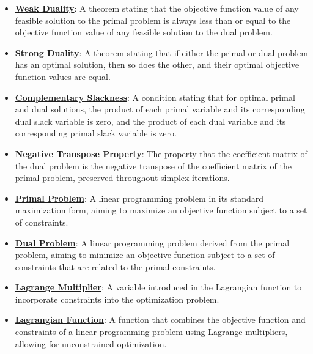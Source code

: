\documentclass{article}%
\begin{document}
\begin{itemize}[leftmargin=*]
\item \href{https://www.math.purdue.edu/~yipn/421/2024-09-12-Duality.pdf#page=2}{\textbf{Weak Duality}}: A theorem stating that the objective function value of any feasible solution to the primal problem is always less than or equal to the objective function value of any feasible solution to the dual problem.%
\item \href{https://www.math.purdue.edu/~yipn/421/2024-09-12-Duality.pdf#page=10}{\textbf{Strong Duality}}: A theorem stating that if either the primal or dual problem has an optimal solution, then so does the other, and their optimal objective function values are equal.%
\item \href{https://www.math.purdue.edu/~yipn/421/2024-09-12-Duality.pdf#page=5}{\textbf{Complementary Slackness}}: A condition stating that for optimal primal and dual solutions, the product of each primal variable and its corresponding dual slack variable is zero, and the product of each dual variable and its corresponding primal slack variable is zero.%
\item \href{https://www.math.purdue.edu/~yipn/421/2024-09-12-Duality.pdf#page=6}{\textbf{Negative Transpose Property}}: The property that the coefficient matrix of the dual problem is the negative transpose of the coefficient matrix of the primal problem, preserved throughout simplex iterations.%
\item \href{https://www.math.purdue.edu/~yipn/421/2024-09-17-DualityGeneral.pdf#page=1}{\textbf{Primal Problem}}: A linear programming problem in its standard maximization form, aiming to maximize an objective function subject to a set of constraints.%
\item \href{https://www.math.purdue.edu/~yipn/421/2024-09-17-DualityGeneral.pdf#page=1}{\textbf{Dual Problem}}: A linear programming problem derived from the primal problem, aiming to minimize an objective function subject to a set of constraints that are related to the primal constraints.%
\item \href{https://www.math.purdue.edu/~yipn/421/2024-09-17-DualityGeneral.pdf#page=2}{\textbf{Lagrange Multiplier}}: A variable introduced in the Lagrangian function to incorporate constraints into the optimization problem.%
\item \href{https://www.math.purdue.edu/~yipn/421/2024-09-17-DualityGeneral.pdf#page=2}{\textbf{Lagrangian Function}}: A function that combines the objective function and constraints of a linear programming problem using Lagrange multipliers, allowing for unconstrained optimization.%

\end{itemize}
\end{document}
